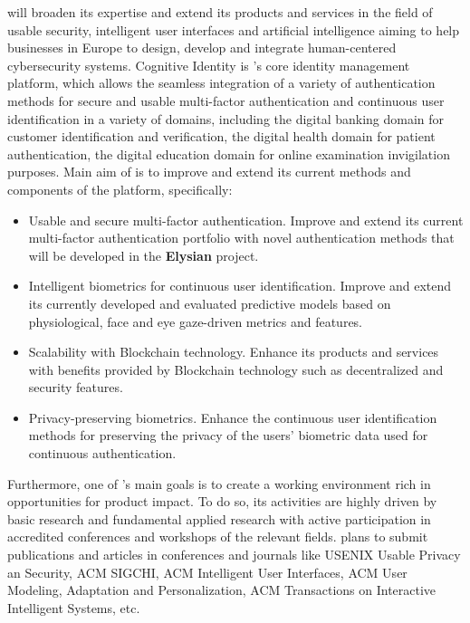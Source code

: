 \documentclass[a4paper,11pt]{article}
\newcommand{\project}[1]{\textbf{#1}\xspace}
\newcommand{\SECURITY}{\project{Elysian}}
\newcommand{\TheProject}{\SECURITY}
\begin{document}
\COGNIshort{} will broaden its expertise and extend its products and services in the field of usable security, intelligent user interfaces and artificial intelligence aiming to help businesses in Europe to design, develop and integrate human-centered cybersecurity systems.
%
Cognitive Identity is \COGNIshort{}'s core identity management platform, which allows the seamless integration of a variety of authentication methods for secure and usable multi-factor authentication and continuous user identification in a variety of domains, including the digital banking domain for customer identification and verification, the digital health domain for patient authentication, the digital education domain for online examination invigilation purposes. Main aim of \COGNIshort{} is to improve and extend its current methods and components of the platform, specifically:

\begin{itemize}
    \item Usable and secure multi-factor authentication. Improve and extend its current multi-factor authentication portfolio with novel authentication methods that will be developed in the \TheProject project.
    \item Intelligent biometrics for continuous user identification. Improve and extend its currently developed and evaluated predictive models based on physiological, face and eye gaze-driven metrics and features.
    \item Scalability with Blockchain technology. Enhance its products
    and services with benefits provided by Blockchain technology such as decentralized and security features.
    \item Privacy-preserving biometrics. Enhance the continuous user identification methods for preserving the privacy of the users' biometric data used for continuous authentication.
\end{itemize}

Furthermore, one of \COGNIshort{}'s main goals is to create a working environment rich in opportunities for product impact. To do so, its activities are highly driven by basic research and fundamental applied research with active participation in accredited conferences and workshops of the relevant fields. \COGNIshort{} plans to submit publications and articles in conferences and journals like USENIX Usable Privacy an Security, ACM SIGCHI, ACM Intelligent User Interfaces, ACM User Modeling, Adaptation and Personalization, ACM Transactions on Interactive Intelligent Systems, etc.
\end{document}
